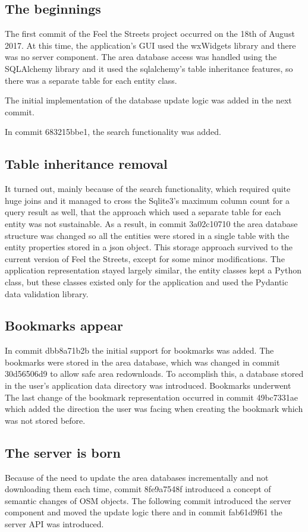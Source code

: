 \documentclass[nolof,digital]{fithesis3}
\begin{document}
\subsection{The beginnings}
The first commit of the Feel the Streets project occurred on the 18th of August 2017. At this time, the application's GUI used the wxWidgets library \parencite{wx} and there was no server component. The area database access was handled using the SQLAlchemy library and it used the sqlalchemy's table inheritance features, so there was a separate table for each entity class.

The initial implementation of the database update logic was added in the next commit.

In commit 683215bbe1, the search functionality was added.
\subsection{Table inheritance removal}
It turned out, mainly because of the search functionality, which required quite huge joins and it managed to cross the Sqlite3's maximum column count for a query result as well, that the approach which used a separate table for each entity was not sustainable. As a result, in commit 3a02c10710 the area database structure was changed so all the entities were stored in a single table with the entity properties stored in a json object. This storage approach survived to the current version of Feel the Streets, except for some minor modifications. The application representation stayed largely similar, the entity classes kept a Python class, but these classes existed only for the application and used the Pydantic data validation library.
\subsection{Bookmarks appear}
In commit dbb8a71b2b the initial support for bookmarks was added. The bookmarks were stored in the area database, which was changed in commit 30d56506d9 to allow safe area redownloads. To accomplish this, a database stored in the user's application data directory was introduced. Bookmarks underwent The last change of the bookmark representation occurred in commit 49bc7331ae which added the direction the user was facing when creating the bookmark which was not stored before.
\subsection{The server is born}
Because of the need to update the area databases incrementally and not downloading them each time, commit 8fe9a7548f introduced a concept of semantic changes of OSM objects. The following commit introduced the server component and moved the update logic there and in commit fab61d9f61 the server API was introduced.
\end{document}
